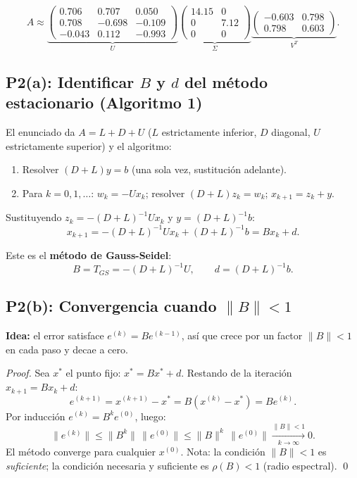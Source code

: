 \documentclass[11pt,a4paper]{article}
\begin{document}
\begin{tcolorbox}[clave]
\[
  A \approx
  \underbrace{\begin{pmatrix}0.706&0.707&0.050\\0.708&-0.698&-0.109\\-0.043&0.112&-0.993\end{pmatrix}}_{U}
  \underbrace{\begin{pmatrix}14.15&0\\0&7.12\\0&0\end{pmatrix}}_{\Sigma}
  \underbrace{\begin{pmatrix}-0.603&0.798\\0.798&0.603\end{pmatrix}}_{V^T}.
\]
\end{tcolorbox}

\subsection{P2(a): Identificar $B$ y $d$ del método estacionario (Algoritmo 1)}
\label{sec:parcial2025_p2a}

El enunciado da $A = L + D + U$ ($L$ estrictamente inferior, $D$ diagonal, $U$ estrictamente
superior) y el algoritmo:
\begin{enumerate}[noitemsep]
  \item Resolver $(D+L)y = b$ (una sola vez, sustitución adelante).
  \item Para $k=0,1,\ldots$: $w_k = -Ux_k$;\; resolver $(D+L)z_k = w_k$;\; $x_{k+1} = z_k + y$.
\end{enumerate}

Sustituyendo $z_k = -(D+L)^{-1}Ux_k$ y $y = (D+L)^{-1}b$:
\[
  x_{k+1} = -(D+L)^{-1}Ux_k + (D+L)^{-1}b = Bx_k + d.
\]

\begin{tcolorbox}[clave]
Este es el \textbf{método de Gauss-Seidel}:
\[
  B = T_{GS} = -(D+L)^{-1}U, \qquad d = (D+L)^{-1}b.
\]
\end{tcolorbox}

\subsection{P2(b): Convergencia cuando $\|B\|<1$}

\textbf{Idea:} el error satisface $e^{(k)}=Be^{(k-1)}$, así que crece por un factor $\|B\|<1$ en cada paso y decae a cero.

\begin{proof}
Sea $x^*$ el punto fijo: $x^*=Bx^*+d$. Restando de la iteración $x_{k+1}=Bx_k+d$:
\[
  e^{(k+1)} = x^{(k+1)}-x^* = B(x^{(k)}-x^*) = Be^{(k)}.
\]
Por inducción $e^{(k)}=B^ke^{(0)}$, luego:
\[
  \|e^{(k)}\| \le \|B^k\|\,\|e^{(0)}\| \le \|B\|^k\,\|e^{(0)}\| \xrightarrow[k\to\infty]{\|B\|<1} 0.
\]
El método converge para cualquier $x^{(0)}$. Nota: la condición $\|B\|<1$ es \emph{suficiente}; la condición necesaria y suficiente es $\rho(B)<1$ (radio espectral). \qed
\end{proof}
\end{document}
